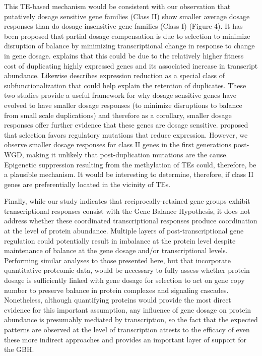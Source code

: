 \documentclass[11pt]{article}
\begin{document}
This TE-based mechanism would be consistent with our observation that putatively dosage sensitive gene families (Class II) show smaller average dosage responses than do dosage insensitive gene families (Class I) (Figure 4). It has been proposed that partial dosage compensation is due to selection to minimize disruption of balance by minimizing transcriptional change in response to change in gene dosage. \cite{katju2018} explains that this could be due to the relatively higher fitness cost of duplicating highly expressed genes and its associated increase in transcript abundance. Likewise \cite{qian2010} describes expression reduction as a special class of subfunctionalization that could help explain the retention of duplicates. These two studies provide a useful framework for why dosage sensitive genes have evolved to have smaller dosage responses (to minimize disruptions to balance from small scale duplications) and therefore as a corollary, smaller dosage responses offer further evidence that these genes are dosage sensitive. \cite{qian2010} proposed that selection favors regulatory mutations that reduce expression. However, we observe smaller dosage responses for class II genes in the first generations post-WGD, making it unlikely that post-duplication mutations are the cause. Epigenetic suppression resulting from the methylation of TEs could, therefore, be a plausible mechanism. It would be interesting to determine, therefore, if class II genes are preferentially located in the vicinity of TEs.

	Finally, while our study indicates that reciprocally-retained gene groups exhibit transcriptional responses consist with the Gene Balance Hypothesis, it does not address whether these coordinated transcriptional responses produce coordination at the level of protein abundance. Multiple layers of post-transcriptional gene regulation could potentially result in imbalance at the protein level despite maintenance of balance at the gene dosage and/or transcriptional levels. Performing similar analyses to those presented here, but that incorporate quantitative proteomic data, would be necessary to fully assess whether protein dosage is sufficiently linked with gene dosage for selection to act on gene copy number to preserve balance in protein complexes and signaling cascades. Nonetheless, although quantifying proteins would provide the most direct evidence for this important assumption, any influence of gene dosage on protein abundance is presumably mediated by transcription, so the fact that the expected patterns are observed at the level of transcription attests to the efficacy of even these more indirect approaches and provides an important layer of support for the GBH.
\end{document}
